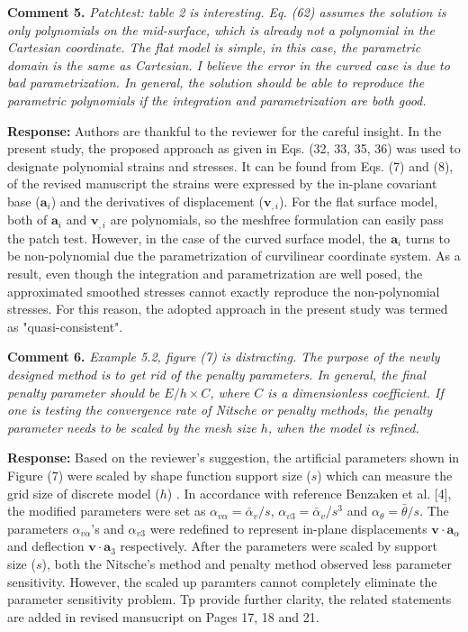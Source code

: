 \documentclass{article}
\begin{document}
\textbf{Comment 5.} \textit{Patchtest: table 2 is interesting. Eq. (62) assumes the solution is only polynomials on the mid-surface, which is already not a polynomial in the Cartesian coordinate. The flat model is simple, in this case, the parametric domain is the same as Cartesian. I believe the error in the curved case is due to bad parametrization. In general, the solution should be able to reproduce the parametric polynomials if the integration and parametrization are both good.}

\textbf{Response:} Authors are thankful to the reviewer for the careful insight. In the present study, the proposed approach as given in Eqs. (32, 33, 35, 36) was used to designate polynomial strains and stresses. It can be found from Eqs. (7) and (8), of the revised manuscript the strains were expressed by the in-plane covariant base ($\boldsymbol a_i$) and the derivatives of displacement ($\boldsymbol v_{,i}$). For the flat surface model, both of $\boldsymbol a_i$ and $\boldsymbol v_{,i}$ are polynomials, so the meshfree formulation can easily pass the patch test. However, in the case of the curved surface model, the $\boldsymbol a_i$ turns to be non-polynomial due the parametrization of curvilinear coordinate system. As a result, even though the integration and parametrization are well posed, the approximated smoothed stresses cannot exactly reproduce the non-polynomial stresses. For this reason, the adopted approach in the present study was termed as "quasi-consistent".
 
\textbf{Comment 6.} \textit{Example 5.2, figure (7) is distracting. The purpose of the newly designed method is to get rid of the penalty parameters. In general, the final penalty parameter should be $E/h\times C$, where $C$ is a dimensionless coefficient. If one is testing the convergence rate of Nitsche or penalty methods, the penalty parameter needs to be scaled by the mesh size $h$, when the model is refined.}

\textbf{Response:} Based on the reviewer's suggestion, the artificial parameters shown in Figure (7) were scaled by shape function support size ($s$) which can measure the grid size of discrete model ($h$) . In accordance with reference Benzaken et al. [4], the modified parameters were set as $\alpha_{v\alpha} = \bar\alpha_v / s$, $\alpha_{v3} = \bar\alpha_v / s^3$ and $\alpha_\theta = \bar \theta / s$. The parameters $\alpha_{v\alpha}$'s and $\alpha_{v3}$ were redefined to represent in-plane displacements $\boldsymbol v \cdot \boldsymbol a_\alpha$ and deflection $\boldsymbol v \cdot \boldsymbol a_3$ respectively. After the parameters were scaled by support size ($s$), both the Nitsche's method and penalty method observed less parameter sensitivity. However, the scaled up paramters cannot completely eliminate the parameter sensitivity problem. Tp provide further clarity, the related statements are added in revised mansucript on Pages 17, 18 and 21.
\end{document}
